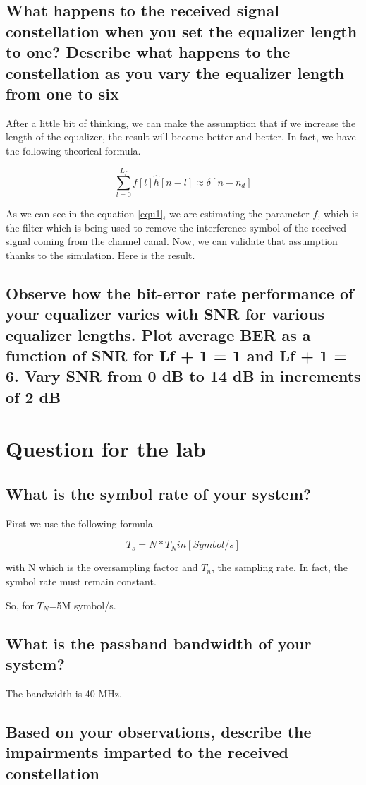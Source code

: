 \documentclass[frenchb, oneside, headings=normal]{scrartcl}
\begin{document}
\subsection{What happens to the received signal constellation when you set the equalizer length to one? Describe what happens to the constellation as you vary the equalizer length from one to six}

After a little bit of thinking, we can make the assumption that if we increase the length of the equalizer, the result will become better and better. In fact, we have the following theorical formula. 

\begin{equation}
\sum_{l=0}^{L_f}f[l]\hat{h}[n-l]\approx \delta [n-n_d]
\label{equ1}
\end{equation}

As we can see in the equation \ref{equ1}, we are estimating the parameter $f$, which is the filter which is being used to remove the interference symbol of the received signal coming from the channel canal.
Now, we can validate that assumption thanks to the simulation. Here is the result.



\subsection{Observe how the bit-error rate performance
of your equalizer varies with SNR for various equalizer lengths. Plot
average BER as a function of SNR for Lf + 1 = 1 and Lf + 1 = 6.
Vary SNR from 0 dB to 14 dB in increments of 2 dB}



\section{Question for the lab}

\subsection{What is the symbol rate of your system?}

First we use the following formula

\begin{equation}
T_s=N*T_N in [Symbol/s]
\end{equation}

with N which is the oversampling factor and $T_n$, the sampling rate. In fact, the symbol rate must remain constant.

So, for $T_N$=5M symbol/s.

\subsection{What is the passband bandwidth of your system?}

The bandwidth is 40 MHz.

\subsection{Based on your observations, describe the impairments imparted to the received constellation}





   
\end{document}
